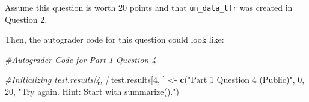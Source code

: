 \documentclass[
  12pt,
]{book}
\newenvironment{Shaded}{\begin{snugshade}}{\end{snugshade}}
\newcommand{\CommentTok}[1]{\textcolor[rgb]{0.56,0.35,0.01}{\textit{#1}}}
\newcommand{\DecValTok}[1]{\textcolor[rgb]{0.00,0.00,0.81}{#1}}
\newcommand{\FunctionTok}[1]{\textcolor[rgb]{0.13,0.29,0.53}{\textbf{#1}}}
\newcommand{\NormalTok}[1]{#1}
\newcommand{\OtherTok}[1]{\textcolor[rgb]{0.56,0.35,0.01}{#1}}
\newcommand{\StringTok}[1]{\textcolor[rgb]{0.31,0.60,0.02}{#1}}
\begin{document}
Assume this question is worth 20 points and that \texttt{un\_data\_tfr} was created in Question 2.

Then, the autograder code for this question could look like:

\begin{Shaded}
\begin{Highlighting}[]
\CommentTok{\#Autograder Code for Part 1 Question 4{-}{-}{-}{-}{-}{-}{-}{-}{-}{-}}

\CommentTok{\#Initializing \textasciigrave{}test.results[4, ]\textasciigrave{}}
\NormalTok{test.results[}\DecValTok{4}\NormalTok{, ] }\OtherTok{\textless{}{-}} \FunctionTok{c}\NormalTok{(}\StringTok{"Part 1 Question 4 (Public)"}\NormalTok{, }\DecValTok{0}\NormalTok{, }\DecValTok{20}\NormalTok{, }\StringTok{"Try again. Hint: Start with summarize()."}\NormalTok{)}
  

\end{Highlighting}
\end{Shaded}
\end{document}
